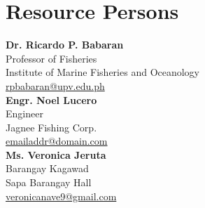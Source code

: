 %
%
%                 

\chapter{Resource Persons}
\label{sec:appendixb}

%
%
%
%

%
%

\newcommand{\resperson}[4]{\textbf{#1} \\ #2 \\ #3 \\ \url{#4}\vspace{0.5em}\\}

\resperson{Dr. Ricardo P. Babaran }{Professor of Fisheries}{Institute of Marine Fisheries and Oceanology}{rpbabaran@upv.edu.ph}
\resperson{Engr. Noel Lucero }{Engineer}{Jagnee Fishing Corp. }{emailaddr@domain.com}
\resperson{Ms. Veronica Jeruta }{Barangay Kagawad}{Sapa Barangay Hall }{veronicanave9@gmail.com}